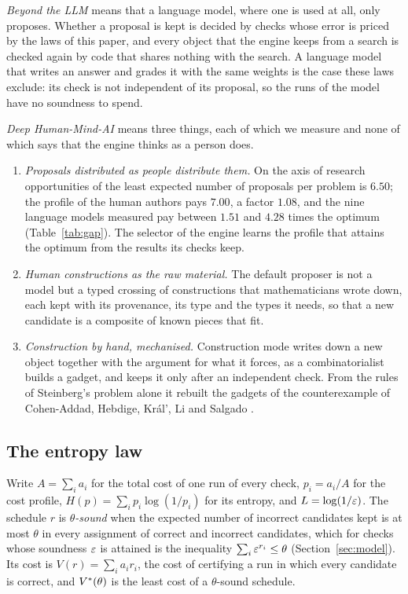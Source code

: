 \emph{Beyond the LLM} means that a language model, where one is used at all, only proposes. Whether a proposal is kept is decided by checks whose error is priced by the laws of this paper, and every object that the engine keeps from a search is checked again by code that shares nothing with the search. A language model that writes an answer and grades it with the same weights is the case these laws exclude: its check is not independent of its proposal, so the runs of the model have no soundness to spend.

\emph{Deep Human-Mind-AI} means three things, each of which we measure and none of which says that the engine thinks as a person does.
\begin{enumerate}[label=(\alph*),leftmargin=1.8em,itemsep=1pt]
\item \emph{Proposals distributed as people distribute them.} On the axis of research opportunities of \cite{CZC26} the least expected number of proposals per problem is $6.50$; the profile of the human authors pays $7.00$, a factor $1.08$, and the nine language models measured pay between $1.51$ and $4.28$ times the optimum (Table~\ref{tab:gap}). The selector of the engine learns the profile that attains the optimum from the results its checks keep.
\item \emph{Human constructions as the raw material.} The default proposer is not a model but a typed crossing of constructions that mathematicians wrote down, each kept with its provenance, its type and the types it needs, so that a new candidate is a composite of known pieces that fit.
\item \emph{Construction by hand, mechanised.} Construction mode writes down a new object together with the argument for what it forces, as a combinatorialist builds a gadget, and keeps it only after an independent check. From the rules of Steinberg's problem alone it rebuilt the gadgets of the counterexample of Cohen-Addad, Hebdige, Kr\'al', Li and Salgado \cite{CHK17}.
\end{enumerate}

\subsection{The entropy law}

Write $A=\sum_{i}a_{i}$ for the total cost of one run of every check, $p_{i}=a_{i}/A$ for the cost profile, $H(p)=\sum_{i}p_{i}\log(1/p_{i})$ for its entropy, and $L=\log(1/\varepsilon)$. The schedule $r$ is \emph{$\theta$-sound} when the expected number of incorrect candidates kept is at most $\theta$ in every assignment of correct and incorrect candidates, which for checks whose soundness $\varepsilon$ is attained is the inequality $\sum_{i}\varepsilon^{r_{i}}\le\theta$ (Section~\ref{sec:model}). Its cost is $V(r)=\sum_{i}a_{i}r_{i}$, the cost of certifying a run in which every candidate is correct, and $V^{*}(\theta)$ is the least cost of a $\theta$-sound schedule.

